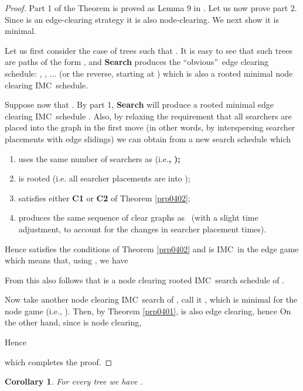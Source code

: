 \documentclass[11pt]{article}\usepackage{amsmath}
\newtheorem{corollary}[theorem]{Corollary}
\begin{document}
\begin{proof}
Part 1 of the Theorem is proved as Lemma 9 in \cite{Barriere1}. Let us now
prove part 2. Since  is an edge-clearing strategy it is also
node-clearing. We next show it is minimal.\ 

Let us first consider the case of trees  such that . It is easy to see that such trees are
paths of the form , and \textbf{Search }produces the
\textquotedblleft obvious\textquotedblright\ edge clearing schedule:
, , ... (or the reverse, starting
at ) which is also a rooted minimal node clearing IMC\ schedule.

Suppose now that . By part 1,
\textbf{Search }will produce a rooted minimal edge clearing IMC\ schedule
. Also, by relaxing the requirement that all searchers are placed
into the graph in the first move (in other words, by interspersing searcher
placements with edge slidings) we can obtain from  a new search
schedule  which

\begin{enumerate}
\item uses the same number of searchers as \textbf{ }(i.e.\textbf{, }\textbf{);}

\item is rooted (i.e. all searcher placements are into );

\item satisfies either \textbf{C1} or \textbf{C2 }of Theorem \ref{prp0402};

\item produces the same sequence of clear graphs  as  \ (with a slight time adjustment, to account for
the changes in searcher placement times).
\end{enumerate}

Hence  satisfies the conditions of Theorem \ref{prp0402}
and is IMC\ in the edge game which means that, using , we
have

From this also follows that  is a node clearing rooted
IMC\ search schedule of .

Now take another node clearing IMC\ search of , call it
, which is minimal for the node game (i.e.,
 ). Then, by Theorem \ref{prp0401},  is also edge clearing, hence
On the other hand, since  is node clearing,

Hence

which completes the proof.
\end{proof}

\begin{corollary}
\label{prp0414}For every tree  we have .
\end{corollary}
\end{document}
